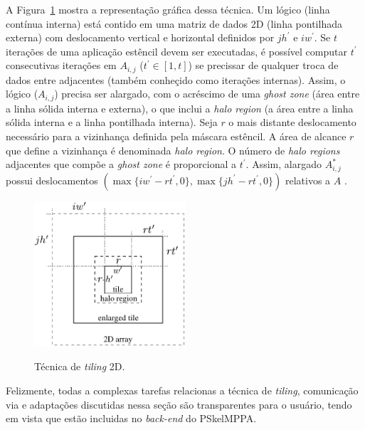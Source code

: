 A Figura~\ref{fig:gputile} mostra a representação gráfica dessa técnica. Um \tile lógico (linha contínua interna) está contido em uma matriz de dados 2D (linha pontilhada externa) com deslocamento vertical e horizontal definidos por $j h^\prime$ e $i w^\prime$. Se $t$ iterações de uma aplicação estêncil devem ser executadas, é possível computar $t^\prime$ consecutivas iterações em $A_{i,j}$ ($t^\prime \in \left[1,t\right]$) se precissar de qualquer troca de dados entre \tiles adjacentes (também conheçido como iterações internas). Assim, o \tile lógico ($A_{i,j}$) precisa ser alargado, com o acréscimo de uma \emph{ghost zone} (área entre a linha sólida interna e externa), o que inclui a \emph{halo region} (a área entre a linha sólida interna e a linha pontilhada interna). Seja $r$ o mais distante deslocamento necessário para a vizinhança definida pela máscara estêncil. A área de alcance $r$ que define a vizinhança é denominada \textit{halo region}. O número de \emph{halo regions} adjacentes que compõe a \emph{ghost zone} é proporcional a $t^\prime$.
%
Assim, \tile alargado $A^\ast_{i,j}$ possui deslocamentos $(\max\{iw^\prime - rt^\prime, 0\}, \max\{jh^\prime - rt^\prime, 0\})$ relativos a $A$ \cite{Podesta:TCC}. 

\begin{figure}
	\centering
	\caption{Técnica de \textit{tiling} 2D.}
	\includegraphics[width=0.5\textwidth]{figs/tile.pdf} \\
	\label{fig:gputile}
\end{figure}

Felizmente, todas a complexas tarefas relacionas a técnica de \textit{tiling}, comunicação via \noc e adaptações discutidas nessa seção são transparentes para o usuário, tendo em vista que estão incluidas no \emph{back-end} do PSkelMPPA.